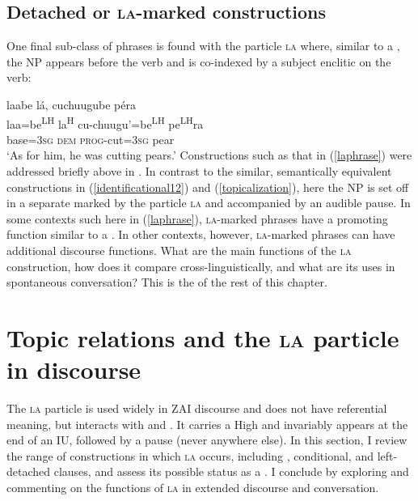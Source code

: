 \subsection{Detached or \textsc{la}-marked constructions}

One final sub-class of  phrases is found with the particle \textsc{la} where, similar to a , the NP appears before the verb and is co-indexed by a subject enclitic on the verb:

\ea\label{laphrase} 
\glll laabe l\'{a}, cuchuugube p\'{e}ra  \\
laa=be\textsuperscript{LH} la\textsuperscript{H} cu-chuugu'=be\textsuperscript{LH} pe\textsuperscript{LH}ra  \\
base=\textsc{3sg} \textsc{dem} \textsc{prog}-cut=\textsc{3sg} pear  \\
\glt `As for him, he was cutting pears.' 
\z
Constructions such as that in (\ref{laphrase}) were addressed briefly above in . In contrast to the similar, semantically equivalent constructions in (\ref{identificational12}) and (\ref{topicalization}), here the NP is set off in a separate  marked by the particle \textsc{la} and accompanied by an audible pause. In some contexts such here in (\ref{laphrase}), \textsc{la}-marked phrases have a  promoting function similar to a . In other contexts, however, \textsc{la}-marked phrases can have additional discourse functions. What are the main functions of the \textsc{la} construction, how does it compare cross-linguistically, and what are its uses in spontaneous conversation? This is the  of the rest of this chapter.



\section{Topic relations and the \textsc{la} particle in discourse}\label{laparticle}

The \textsc{la} particle is used widely in ZAI discourse and does not have referential meaning, but interacts with  and . It carries a High  and invariably appears at the end of an IU, followed by a pause (never anywhere else). In this section, I review the range of constructions in which \textsc{la} occurs, including , conditional, and left-detached clauses, and assess its possible status as a . I conclude by exploring and commenting on the functions of \textsc{la} in extended discourse and conversation. 

